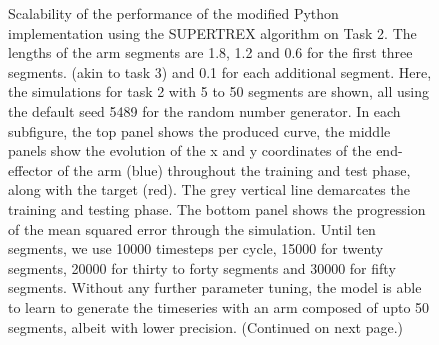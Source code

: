 \begin{figure}
\begin{subfigure}{\textwidth}
        \end{subfigure}
    \caption{Scalability of the performance of the modified Python implementation using the SUPERTREX algorithm on Task 2. The lengths of the arm segments are 1.8, 1.2 and 0.6 for the first three segments. (akin to task 3) and 0.1 for each additional segment. Here, the simulations for task 2 with 5 to 50 segments are shown, all using the default seed 5489 for the random number generator. In each subfigure, the top panel shows the produced curve, the middle panels show the evolution of the x and y coordinates of the end-effector of the arm (blue) throughout the training and test phase, along with the target (red). The grey vertical line demarcates the training and testing phase. The bottom panel shows the progression of the mean squared error through the simulation. Until ten segments, we use 10000 timesteps per cycle, 15000 for twenty segments, 20000 for thirty to forty segments and 30000 for fifty segments. Without any further parameter tuning, the model is able to learn to generate the timeseries with an arm composed of upto 50 segments, albeit with lower precision. (Continued on next page.)}
    \label{Fig:Scalability_Task2}

\end{figure}
    

